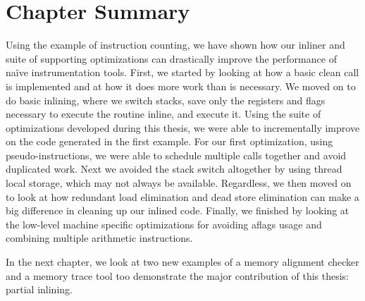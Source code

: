 \section{Chapter Summary}

Using the example of instruction counting, we have shown how our inliner and
suite of supporting optimizations can drastically improve the performance of
na\"ive instrumentation tools.  First, we started by looking at how a basic
clean call is implemented and at how it does more work than is necessary.  We
moved on to do basic inlining, where we switch stacks, save only the registers
and flags necessary to execute the routine inline, and execute it.  Using the
suite of optimizations developed during this thesis, we were able to
incrementally improve on the code generated in the first example.  For our first
optimization, using pseudo-instructions, we were able to schedule multiple calls
together and avoid duplicated work.  Next we avoided the stack switch altogether
by using thread local storage, which may not always be available.  Regardless,
we then moved on to look at how redundant load elimination and dead store
elimination can make a big difference in cleaning up our inlined code.  Finally,
we finished by looking at the low-level machine specific optimizations for
avoiding aflags usage and combining multiple arithmetic instructions.

In the next chapter, we look at two new examples of a memory alignment checker
and a memory trace tool too demonstrate the major contribution of this thesis:
partial inlining.
